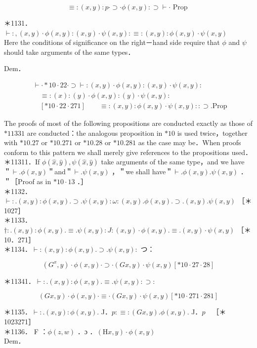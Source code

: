 \documentclass[10pt]{article}
\begin{document}
$$
\equiv:(x, y): p \cdot \supset \cdot \phi(x, y): \supset \vdash \cdot \text { Prop }
$$

＊1131．$\vdash:,(x, y) \cdot \phi(x, y):(x, y) \cdot \psi(x, y): \equiv:(x, y): \phi(x, y) \cdot \psi(x, y)$\\
Here the conditions of significance on the right－hand side require that $\phi$ and $\psi$ should take arguments of the same types．

Dem．

$$
\begin{aligned}
& \vdash \cdot * 10 \cdot 22 \cdot \supset \vdash:(x, y) \cdot \phi(x, y):(x, y) \cdot \psi(x, y): \\
& \quad \equiv:(x):(y) \cdot \phi(x, y):(y) \cdot \psi(x, y): \\
& \quad[* 10 \cdot 22 \cdot 271] \quad \quad \equiv:(x, y): \phi(x, y) \cdot \psi(x, y):: \supset \text {.Prop }
\end{aligned}
$$

The proofs of most of the following propositions are conducted exactly as those of $* 11331$ are conducted：the analogous proposition in $* 10$ is used twice，together with $* 10.27$ or $* 10.271$ or $* 10.28$ or $* 10.281$ as the case may be．When proofs conform to this pattern we shall merely give references to the propositions used．\\
＊11311．If $\phi(\hat{x}, \hat{y}), \psi(\hat{x}, \hat{y})$ take arguments of the same type，and we have ＂$\vdash . \phi(x, y)$＂and＂$\vdash . \psi(x, y)$ ，＂we shall have＂$\vdash . \phi(x, y) . \psi(x, y)$ ．＂［Proof as in $* 10 \cdot 13$ ．］\\
＊1132．$\vdash: .(x, y): \phi(x, y) . \supset . \psi(x, y): \omega:(x, y) . \phi(x, y) . \supset .(x, y) . \psi(x, y)$ ［＊1027］\\
＊1133．$\dagger: .(x, y): \phi(x, y) . \equiv . \psi(x, y): J:(x, y) \cdot \phi(x, y) . \equiv .(x, y) \cdot \psi(x, y)$ ［＊10．271］\\
＊1134．$\vdash:(x, y): \phi(x, y) . \supset . \psi(x, y):$ つ：

$$
\left(G^{x}, y\right) \cdot \phi(x, y) \cdot \supset \cdot(G x, y) \cdot \psi(x, y)[* 10 \cdot 27 \cdot 28]
$$

＊11341．$\vdash: .(x, y): \phi(x, y) . \equiv . \psi(x, y): \supset:$

$$
(G x, y) \cdot \phi(x, y) \cdot \equiv \cdot(G x, y) \cdot \psi(x, y)[* 10 \cdot 271 \cdot 281]
$$

＊1135．$\vdash: .(x, y): \phi(x, y)$. J．$p: \equiv:(G x, y) . \phi(x, y)$. J．$p \quad$［＊1023271］\\
＊1136． F ：$\phi(z, w)$ ．ɔ ．$(\mathrm{H} x, y) \cdot \phi(x, y)$\\
Dem．
\end{document}

